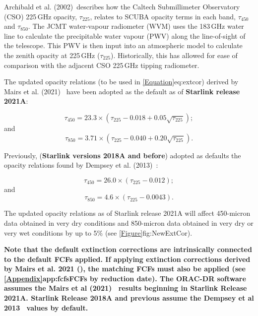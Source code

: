 Archibald et al. (2002)\,\cite{archibald} describes how the Caltech
Submillimeter Observatory (CSO) 225\,GHz opacity, $\tau_{225}$,
relates to SCUBA opacity terms in each band, $\tau_{450}$ and
$\tau_{850}$. The JCMT water-vapour radiometer (WVM) uses the 183\,GHz
water line to calculate the precipitable water vapour (PWV) along the
line-of-sight of the telescope. This PWV is then input into an
atmospheric model to calculate the zenith opacity at 225\,GHz
($\tau_{225}$). Historically, this has allowed for ease of 
comparison with the adjacent CSO 225\,GHz tipping radiometer. 

The updated opacity relations (to be used in \cref{Equation}{eq:extcor}{})
derived by Mairs et al. (2021)~\cite{mairs21}
have been adopted as the default as of \textbf{Starlink release 2021A}:

\begin{equation}
\tau_{450} = 23.3 \times (\tau_{225} - 0.018 + 0.05\sqrt{\tau_{225}});
\end{equation}
and
\begin{equation}
\tau_{850} = 3.71 \times (\tau_{225} - 0.040 + 0.20\sqrt{\tau_{225}}).
\end{equation}

Previously, (\textbf{Starlink versions 2018A and before}) adopted as defaults the opacity relations 
found by Dempsey et al. (2013)~\cite{dempsey12}:

\begin{equation}
\tau_{450} = 26.0 \times (\tau_{225} - 0.012);
\end{equation}
and
\begin{equation}
\tau_{850} = 4.6 \times (\tau_{225} - 0.0043).
\end{equation}

The updated opacity relations as of Starlink release 2021A  will affect 
450-micron data obtained in very dry conditions and 850-micron data
obtained in very dry or very wet conditions by up to 5\% (see \cref{Figure}{fig:NewExtCor}{}).

\textbf{Note that the default extinction corrections are intrinsically connected to the default FCFs
applied. If applying extinction corrections derived by Mairs et al. 2021 (\cite{mairs21}), the matching
FCFs must also be applied (see \cref{Appendix}{app:fcfs}{FCFs by reduction date}).
The ORAC-DR software assumes the Mairs et al (2021)~\cite{mairs21}
results beginning in Starlink Release 2021A. Starlink Release 2018A and previous assume the
Dempsey et al 2013~\cite{dempsey12} values by default.}

